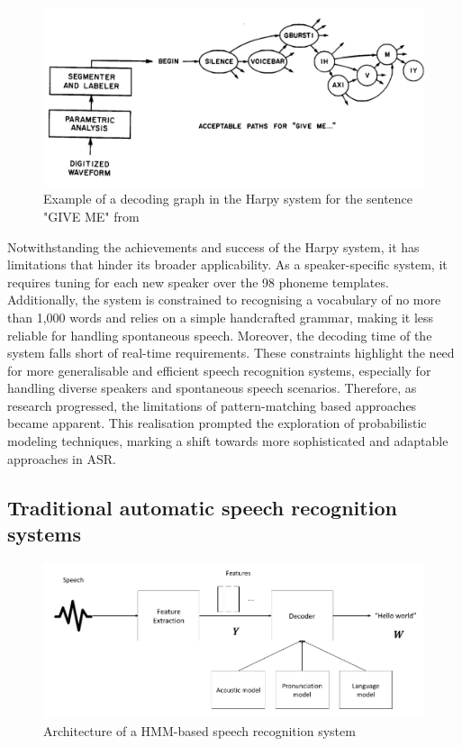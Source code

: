 \begin{figure}[h]
\includegraphics[width=\textwidth]{imgs/harpy.png}
\caption{Example of a decoding graph in the Harpy system for the sentence "GIVE ME" from \cite{klatt1977review}}
\label{harpy}
\end{figure}

Notwithstanding the achievements and success of the Harpy system, it has limitations that hinder its broader applicability. As a speaker-specific system, it requires tuning for each new speaker over the 98 phoneme templates. Additionally, the system is constrained to recognising a vocabulary of no more than 1,000 words and relies on a simple handcrafted grammar, making it less reliable for handling spontaneous speech. Moreover, the decoding time of the system falls short of real-time requirements. These constraints highlight the need for more generalisable and efficient speech recognition systems, especially for handling diverse speakers and spontaneous speech scenarios. Therefore, as research progressed, the limitations of pattern-matching based approaches became apparent. This realisation prompted the exploration of probabilistic modeling techniques, marking a shift towards more sophisticated and adaptable approaches in \ac{ASR}. 


\subsection{Traditional automatic speech recognition systems} %
\begin{figure}
\includegraphics[width=\textwidth]{imgs/HMM-GMM_architecture.png}
\caption{Architecture of a HMM-based speech recognition system}
\label{HMM-GMM-model}
\end{figure}

